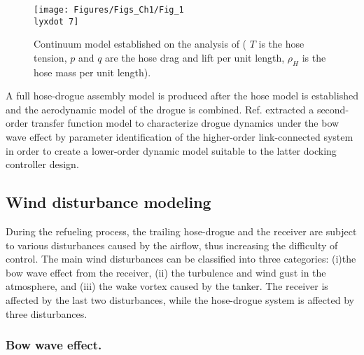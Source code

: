 \begin{figure}
\begin{centering}
\texttt{[image: Figures/Figs\_Ch1/Fig\_1\\lyxdot 7]}
\par\end{centering}
\caption{Continuum model established on the analysis of \cite{paniagua2021aeroelastic}
( $T$ is the hose tension, $p$ and $q$ are the hose drag and lift
per unit length, $\rho_{H}$ is the hose mass per unit length).}

\centering{}\label{Fig_1.7}
\end{figure}

A full hose-drogue assembly model is produced after the hose model
is established and the aerodynamic model of the drogue is combined.
Ref. \cite{wei2016drogue} extracted a second-order transfer function
model to characterize drogue dynamics under the bow wave effect by
parameter identification of the higher-order link-connected system
in order to create a lower-order dynamic model suitable to the latter
docking controller design.

\subsection{Wind disturbance modeling}

During the refueling process, the trailing hose-drogue and the receiver
are subject to various disturbances caused by the airflow, thus increasing
the difficulty of control. The main wind disturbances can be classified
into three categories: (i)the bow wave effect from the receiver, (ii)
the turbulence and wind gust in the atmosphere, and (iii) the wake
vortex caused by the tanker. The receiver is affected by the last
two disturbances, while the hose-drogue system is affected by three
disturbances.

\subsubsection{Bow wave effect. }

